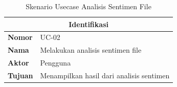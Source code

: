 \begin{longtable}[c]{|ll|}
  \caption{Skenario Usecase Analisis Sentimen File}
  \label{tab:scenario_usecase_file}                                                                                                                                                                                                                                                                                                             \\
  \hline
  \multicolumn{2}{|c|}{\textbf{Identifikasi}}                                                                                                                                                                                                                                                                                                   \\ \hline
  \endhead
  \multicolumn{1}{|l|}{\textbf{Nomor}}                                                                  &
  UC-02                                                                                                                                                                                                                                                                                                                                         \\ \hline
  \multicolumn{1}{|l|}{\textbf{Nama}}                                                                   &
  Melakukan analisis sentimen file                                                                                                                                                                                                                                                                                                              \\ \hline
  \multicolumn{1}{|l|}{\textbf{Aktor}}                                                                  &
  Pengguna                                                                                                                                                                                                                                                                                                                                      \\ \hline
  \multicolumn{1}{|l|}{\textbf{Tujuan}}                                                                 &
  Menampilkan hasil dari analisis sentimen                                                                                                                                                                                                                                                                                                      \\ \hline

\end{longtable}
